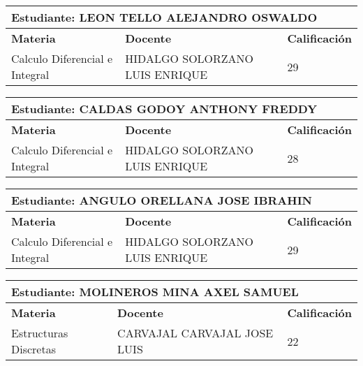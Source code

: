 \small
\begin{tabularx}{\textwidth}{|p{5cm}|p{7cm}|X|}
\hline
\multicolumn{3}{|p{\dimexpr\textwidth-2\tabcolsep-2\arrayrulewidth}|}{\textbf{Estudiante: LEON TELLO ALEJANDRO OSWALDO }}\\\hline
\textbf{Materia} & \textbf{Docente} & \textbf{Calificación} \\ \hline
Calculo Diferencial e Integral & HIDALGO SOLORZANO LUIS ENRIQUE  & 29 \\ \hline
\end{tabularx}\vspace{10mm}
\small
\begin{tabularx}{\textwidth}{|p{5cm}|p{7cm}|X|}
\hline
\multicolumn{3}{|p{\dimexpr\textwidth-2\tabcolsep-2\arrayrulewidth}|}{\textbf{Estudiante: CALDAS GODOY ANTHONY FREDDY }}\\\hline
\textbf{Materia} & \textbf{Docente} & \textbf{Calificación} \\ \hline
Calculo Diferencial e Integral & HIDALGO SOLORZANO LUIS ENRIQUE  & 28 \\ \hline
\end{tabularx}\vspace{10mm}
\small
\begin{tabularx}{\textwidth}{|p{5cm}|p{7cm}|X|}
\hline
\multicolumn{3}{|p{\dimexpr\textwidth-2\tabcolsep-2\arrayrulewidth}|}{\textbf{Estudiante: ANGULO ORELLANA JOSE IBRAHIN }}\\\hline
\textbf{Materia} & \textbf{Docente} & \textbf{Calificación} \\ \hline
Calculo Diferencial e Integral & HIDALGO SOLORZANO LUIS ENRIQUE  & 29 \\ \hline
\end{tabularx}\vspace{10mm}
\small
\begin{tabularx}{\textwidth}{|p{5cm}|p{7cm}|X|}
\hline
\multicolumn{3}{|p{\dimexpr\textwidth-2\tabcolsep-2\arrayrulewidth}|}{\textbf{Estudiante: MOLINEROS MINA AXEL SAMUEL }}\\\hline
\textbf{Materia} & \textbf{Docente} & \textbf{Calificación} \\ \hline
Estructuras Discretas & CARVAJAL CARVAJAL JOSE LUIS  & 22 \\ \hline
\end{tabularx}\vspace{10mm}
